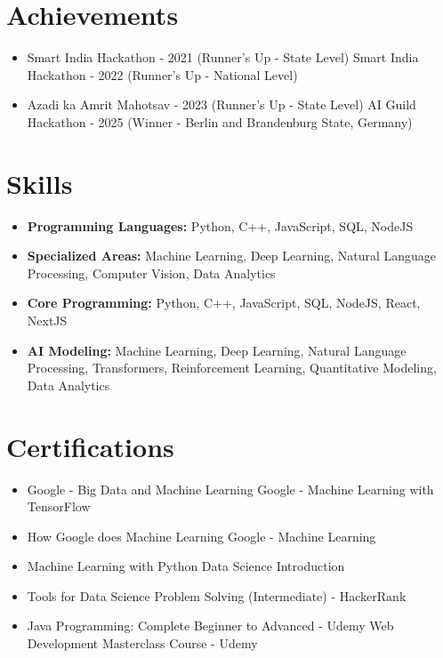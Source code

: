 \documentclass[a4paper,10pt]{article}
\begin{document}
\section*{Achievements}
\begin{itemize}
\item Smart India Hackathon - 2021 (Runner's Up - State Level) \hfill Smart India Hackathon - 2022 (Runner's Up - National Level)
\item Azadi ka Amrit Mahotsav - 2023 (Runner's Up - State Level) \hfill AI Guild Hackathon - 2025 (Winner - Berlin and Brandenburg State, Germany)
\end{itemize}

\section*{Skills}
\begin{itemize}
  \item \textbf{Programming Languages:} Python, C++, JavaScript, SQL, NodeJS
  \item \textbf{Specialized Areas:} Machine Learning, Deep Learning, Natural Language Processing, Computer Vision, Data Analytics
  \item \textbf{Core Programming:} Python, C++, JavaScript, SQL, NodeJS, React, NextJS
  \item \textbf{AI Modeling:} Machine Learning, Deep Learning, Natural Language Processing, Transformers, Reinforcement Learning, Quantitative Modeling, Data Analytics
\end{itemize}

\section*{Certifications}
\begin{itemize}
\item Google - Big Data and Machine Learning \hfill Google - Machine Learning with TensorFlow
\item How Google does Machine Learning \hfill Google - Machine Learning
\item Machine Learning with Python \hfill Data Science Introduction
\item Tools for Data Science \hfill Problem Solving (Intermediate) - HackerRank
\item Java Programming: Complete Beginner to Advanced - Udemy \hfill Web Development Masterclass Course - Udemy
\end{itemize}
\end{document}
